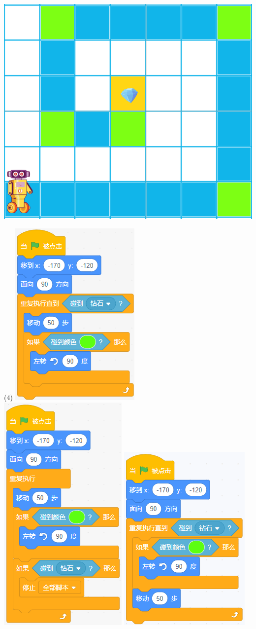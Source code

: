 \documentclass[10pt, a4paper]{article}
\begin{document}
\begin{enumerate}
        \begin{minipage}{.2\textwidth}
            \centering
            \includegraphics[width=\textwidth]{figure/20.png}
        \end{minipage}
        \begin{minipage}{.73\textwidth}
            \begin{tasks}(4)
                \task \includegraphics[width=.18\textwidth]{figure/20a.png}
                \task \includegraphics[width=.14\textwidth]{figure/20b.png}
                \task \includegraphics[width=.18\textwidth]{figure/20c.png}

\end{tasks}
\end{minipage}
\end{enumerate}
\end{document}
